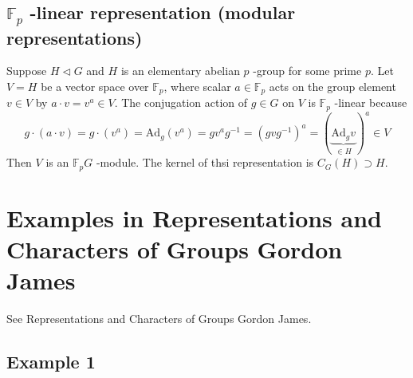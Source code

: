 \subsection{\texorpdfstring{$\mathbb{F}_{p}$}{mathbbF_p} -linear representation (modular representations)}

Suppose $H\lhd G$ and $H$ is an elementary abelian $p$ -group for some prime $p$. Let $V=H$ be a vector space over $\mathbb{F}_{p}$, where scalar $a\in \mathbb{F}_{p}$ acts on the group element $v\in V$ by $a\cdot v=v^{a}\in V$. The conjugation action of $g\in G$ on $V$ is $\mathbb{F}_{p}$ -linear because
\[
g\cdot(a\cdot v)=g\cdot(v^{a})=\mathrm{Ad}_{g}(v^{a})=gv^{a}g^{-1}=(gvg^{-1})^{a}=(\underbrace{ \mathrm{Ad}_{g}v }_{ \in H })^{a}\in V
\]
Then $V$ is an $\mathbb{F}_{p}G$ -module. The kernel of thsi representation is $C_{G}(H)\supset H$.

\section{Examples in Representations and Characters of Groups Gordon James}

See Representations and Characters of Groups Gordon James.

\subsection{Example 1}


